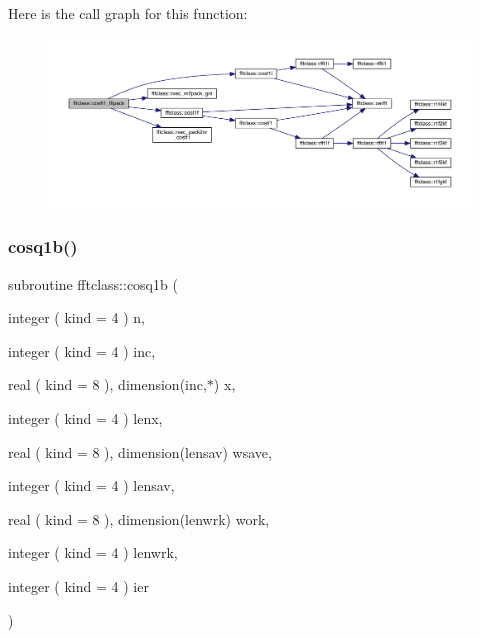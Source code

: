 Here is the call graph for this function\+:\nopagebreak
\begin{figure}[H]
\begin{center}
\leavevmode
\includegraphics[width=350pt]{namespacefftclass_ac4347b89b0b1a5894943daa3f37c54ee_cgraph}
\end{center}
\end{figure}
\mbox{\label{namespacefftclass_a6684b378360642f160b255df6b3aa0bd}} 
\subsubsection{\texorpdfstring{cosq1b()}{cosq1b()}}
{\footnotesize\ttfamily subroutine fftclass\+::cosq1b (\begin{DoxyParamCaption}\item[{integer ( kind = 4 )}]{n,  }\item[{integer ( kind = 4 )}]{inc,  }\item[{real ( kind = 8 ), dimension(inc,$\ast$)}]{x,  }\item[{integer ( kind = 4 )}]{lenx,  }\item[{real ( kind = 8 ), dimension(lensav)}]{wsave,  }\item[{integer ( kind = 4 )}]{lensav,  }\item[{real ( kind = 8 ), dimension(lenwrk)}]{work,  }\item[{integer ( kind = 4 )}]{lenwrk,  }\item[{integer ( kind = 4 )}]{ier }\end{DoxyParamCaption})}

